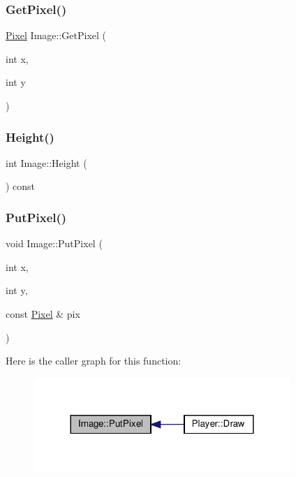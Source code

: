 \subsubsection{\texorpdfstring{Get\+Pixel()}{GetPixel()}}
{\footnotesize\ttfamily \hyperlink{structPixel}{Pixel} Image\+::\+Get\+Pixel (\begin{DoxyParamCaption}\item[{int}]{x,  }\item[{int}]{y }\end{DoxyParamCaption})\hspace{0.3cm}{\ttfamily [inline]}}

\mbox{\label{structImage_a617543a57fd7abf1a4a052539fe35807}} 
\subsubsection{\texorpdfstring{Height()}{Height()}}
{\footnotesize\ttfamily int Image\+::\+Height (\begin{DoxyParamCaption}{ }\end{DoxyParamCaption}) const\hspace{0.3cm}{\ttfamily [inline]}}

\mbox{\label{structImage_ad728f53861c64498690a311abe1667c4}} 
\subsubsection{\texorpdfstring{Put\+Pixel()}{PutPixel()}}
{\footnotesize\ttfamily void Image\+::\+Put\+Pixel (\begin{DoxyParamCaption}\item[{int}]{x,  }\item[{int}]{y,  }\item[{const \hyperlink{structPixel}{Pixel} \&}]{pix }\end{DoxyParamCaption})\hspace{0.3cm}{\ttfamily [inline]}}

Here is the caller graph for this function\+:\nopagebreak
\begin{figure}[H]
\begin{center}
\leavevmode
\includegraphics[width=276pt]{structImage_ad728f53861c64498690a311abe1667c4_icgraph}
\end{center}
\end{figure}
\mbox{\label{structImage_a4cb69c5911f1f8e4944047825dcf117c}} 
